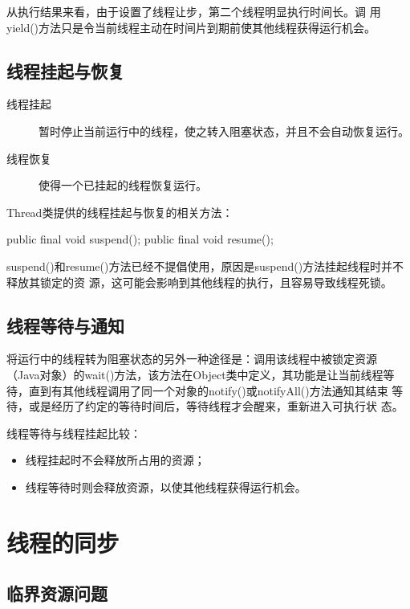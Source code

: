 从执行结果来看，由于设置了线程让步，第二个线程明显执行时间长。调
用yield()方法只是令当前线程主动在时间片到期前使其他线程获得运行机会。

\subsection{线程挂起与恢复}

\begin{description}
\item[线程挂起] 暂时停止当前运行中的线程，使之转入阻塞状态，并且不会自动恢复运行。
\item[线程恢复] 使得一个已挂起的线程恢复运行。
\end{description}

Thread类提供的线程挂起与恢复的相关方法：

\begin{javaCode}
public final void suspend();
public final void resume();
\end{javaCode}

suspend()和resume()方法已经不提倡使用，原因是suspend()方法挂起线程时并不释放其锁定的资
源，这可能会影响到其他线程的执行，且容易导致线程死锁。

\subsection{线程等待与通知}

将运行中的线程转为阻塞状态的另外一种途径是：调用该线程中被锁定资源
（Java对象）的wait()方法，该方法在Object类中定义，其功能是让当前线程等
待，直到有其他线程调用了同一个对象的notify()或notifyAll()方法通知其结束
等待，或是经历了约定的等待时间后，等待线程才会醒来，重新进入可执行状
态。
 
线程等待与线程挂起比较：

\begin{itemize}
\item 线程挂起时不会释放所占用的资源；
\item 线程等待时则会释放资源，以使其他线程获得运行机会。
\end{itemize}

\section{线程的同步}

\subsection{临界资源问题}

